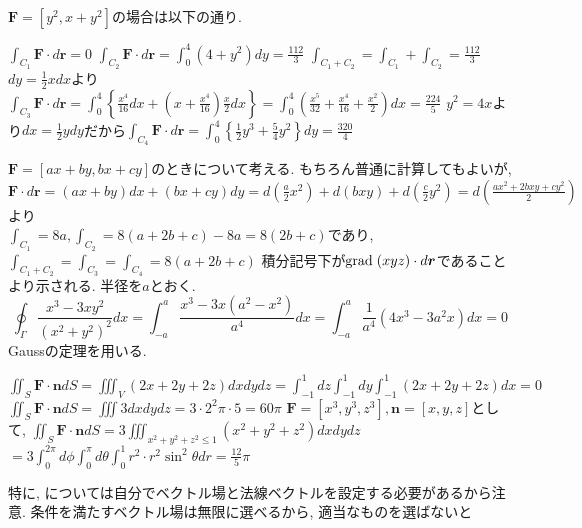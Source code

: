 \documentclass[a4j,dvipdfmx]{jsarticle}
\newcommand{\grad}{{\rm grad}\hspace{1mm}}
\begin{document}
        \begin{qparts}
            \qpart $\bm{F}=[y^2,x+y^2]$の場合は以下の通り.
            \begin{qlist}
                \qitem $\int_{C_1}\bm{F}\cdot d\bm{r}=0$
                \qitem $\int_{C_2}\bm{F}\cdot d\bm{r}=\int_{0}^{4}(4+y^2)dy=\frac{112}{3}$
                \qitem $\int_{C_1+C_2}=\int_{C_1}+\int_{C_2}=\frac{112}{3}$
                \qitem $dy=\frac{1}{2}xdx$より$\int_{C_3}\bm{F}\cdot d\bm{r}=\int_0^4\left\{\frac{x^4}{16}dx+\left(x+\frac{x^4}{16}\right)\frac{x}{2}dx\right\}=\int_0^4\left(\frac{x^5}{32}+\frac{x^4}{16}+\frac{x^2}{2}\right)dx=\frac{224}{5}$
                \qitem $y^2=4x$より$dx=\frac{1}{2}ydy$だから$\int_{C_4}\bm{F}\cdot d\bm{r}=\int_0^4\left\{\frac{1}{2}y^3+\frac{5}{4}y^2\right\}dy=\frac{320}{4}$
            \end{qlist}
            $\bm{F}=[ax+by,bx+cy]$のときについて考える. もちろん普通に計算してもよいが, $\bm{F}\cdot d\bm{r}=(ax+by)dx+(bx+cy)dy=d\left(\frac{a}{2}x^2\right)+d(bxy)+d\left(\frac{c}{2}y^2\right)=d\left(\frac{ax^2+2bxy+cy^2}{2}\right)$より\\
            $\int_{C_1} = 8a,\int_{C_2}=8(a+2b+c)-8a=8(2b+c)$であり, $\int_{C_1+C_2}=\int_{C_3}=\int_{C_4}=8(a+2b+c)$
        \qpart 積分記号下が$\grad (xyz)\cdot d\bm{r}$であることより示される.
        \qpart 半径を$a$とおく.
            \begin{equation*}
                \oint_\Gamma \frac{x^3-3xy^2}{(x^2+y^2)^2}dx=\int_{-a}^{a} \frac{x^3-3x(a^2-x^2)}{a^4}dx=\int_{-a}^{a}\frac{1}{a^4}(4x^3-3a^2x)dx=0
            \end{equation*}
        \qpart Gaussの定理を用いる.
            \begin{qlist}
                \qitem $\displaystyle \iint_S \bm{F}\cdot\bm{n}dS=\iiint_V (2x+2y+2z)dxdydz=\int_{-1}^{1}dz\int_{-1}^{1}dy\int_{-1}^{1}(2x+2y+2z)dx=0$
                \qitem $\displaystyle \iint_S\bm{F}\cdot\bm{n}dS=\iiint3dxdydz=3\cdot 2^2\pi\cdot 5 = 60\pi$
                \qitem $\bm{F}=[x^3,y^3,z^3],\bm{n}=[x,y,z]$として, $\displaystyle \iint_S \bm{F}\cdot\bm{n}dS=3\iiint_{x^2+y^2+z^2\leq 1}(x^2+y^2+z^2)dxdydz$\\
                $\displaystyle=3\int_{0}^{2\pi}d\phi\int_{0}^{\pi}d\theta\int_{0}^{1}r^2\cdot r^2\sin^2\theta dr=\frac{12}{5}\pi$\label{q:Gauss直接できないやつ}
            \end{qlist}
            特に, については自分でベクトル場と法線ベクトルを設定する必要があるから注意. 条件を満たすベクトル場は無限に選べるから, 適当なものを選ばないと

\end{qparts}
\end{document}
